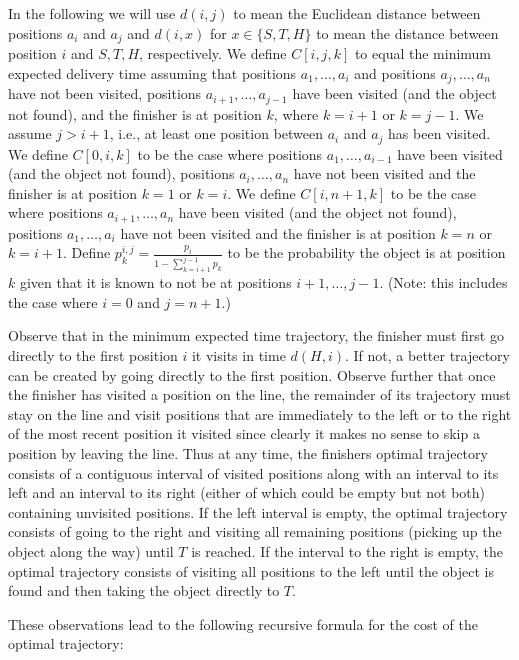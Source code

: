 \documentclass{article}
\begin{document}
In the following we will use $d(i, j)$ to mean the Euclidean distance between positions $a_i$ and $a_j$ and $d(i, x)$ for $x \in \{ S, T, H \}$ to mean the distance
between position $i$ and $S, T, H$, respectively. 
We define $C[i, j, k]$ to equal the minimum expected delivery time assuming that positions $a_1, \ldots, a_i$ and positions $a_j, \ldots, a_n$ have not been visited, 
positions $a_{i+1}, \ldots ,a_{j-1}$ have been visited (and the object not found), and the finisher is at position $k$, where $k = i+1$ or $k= j-1$. We assume $j > i+1$, i.e., 
at least one position between $a_i$ and $a_j$ has been visited. We  define $C[0, i, k]$ to be the case where positions $a_1, \ldots, a_{i-1}$ have been visited (and the object not found), positions $a_{i}, \ldots, a_n$ have not
been visited and the finisher is at position $k=1$ or $k=i$. 
We define $C[i, n+1, k]$ to be the case where positions $a_{i+1}, \ldots, a_n$ have been visited (and the object not found), positions $a_1, \ldots, a_{i} $ have not
been visited  and the finisher is at position $k=n$ or $k=i+1$.
Define  $p_k^{i,j} = \frac{p_i}{1-\sum_{k=i+1}^{j-1} p_k }$ to be the probability the object is at position $k$ given that it is known to not be at positions $i+1, \ldots, j-1$. (Note: this
includes the case where $i=0$ and $j=n+1$.)


Observe that in the minimum expected time trajectory, the finisher must first go directly to the first position $i$ it visits in time $d(H,i)$. If not, a better trajectory can be created by
going directly to the first position. Observe further that once the finisher has visited a position on the line, the remainder of its trajectory must stay on the line and visit positions
that are immediately to the left or to the right of the most recent position it visited since clearly it makes no sense to skip a position by leaving the line.
Thus at any time, the finishers optimal trajectory consists of a contiguous interval of visited positions along with an interval to its left and an interval to its right (either of which
could be empty but not both) containing unvisited positions. If the left interval is empty, the optimal trajectory consists of going to the right and visiting all remaining positions
(picking up the object along the way) until $T$ is reached. If the interval to the right is empty, the optimal trajectory consists of visiting all positions to the left until the object is found and then taking the object directly to $T$.

These observations lead to the following recursive formula for the cost of the optimal trajectory:
\end{document}
